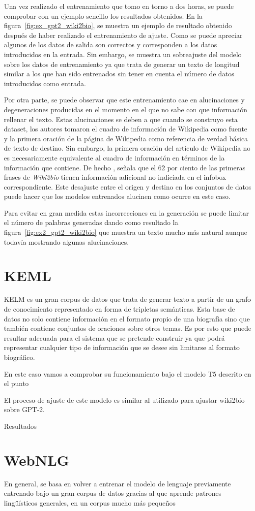 Una vez realizado el entrenamiento que tomo en torno a dos horas, se puede comprobar con un ejemplo sencillo los resultados obtenidos. En la figura~\ref{fig:ex_gpt2_wiki2bio}, se muestra un ejemplo de resultado obtenido después de haber realizado el entrenamiento de ajuste. Como se puede apreciar algunos de los datos de salida son correctos y corresponden a los datos introducidos en la entrada. Sin embargo, se muestra un sobreajuste del modelo sobre los datos de entrenamiento ya que trata de generar un texto de longitud similar a los que han sido entrenados sin tener en cuenta el número de datos introducidos como entrada. 


Por otra parte, se puede observar que este entrenamiento cae en alucinaciones y degeneraciones producidas en el momento en el que no sabe con que información rellenar el texto. Estas alucinaciones se deben a que cuando se construyo esta dataset, los autores tomaron el cuadro de información de Wikipedia como fuente y la primera oración de la página de Wikipedia como referencia de verdad básica de texto de destino. Sin embargo, la primera oración del artículo de Wikipedia no es necesariamente equivalente al cuadro de información en términos de la información que contiene. De hecho \cite{dhingra2019handling}, señala que el 62 por ciento de las primeras frases de \textit{Wiki2bio} tienen información adicional no indiciada en el infobox correspondiente. Este desajuste entre el origen y destino en los conjuntos de datos puede hacer que los modelos entrenados alucinen como ocurre en este caso.

Para evitar en gran medida estas incorrecciones en la generación se puede limitar el número de palabras generadas dando como resultado la figura~\ref{fig:ex2_gpt2_wiki2bio} que muestra un texto mucho más natural aunque todavía mostrando algunas alucinaciones.


\section{KEML}
KELM es un gran corpus de datos que trata de generar texto a partir de un grafo de conocimiento representado en forma de tripletas semánticas. Esta base de datos no solo contiene información en el formato propio de una biografía sino que también contiene conjuntos de oraciones sobre otros temas. Es por esto que puede resultar adecuada para el sistema que se pretende construir ya que podrá representar cualquier tipo de información que se desee sin limitarse al formato biográfico.

En este caso vamos a comprobar su funcionamiento bajo el modelo T5 descrito en el punto %

El proceso de ajuste de este modelo es similar al utilizado para ajustar wiki2bio sobre GPT-2.

Resultados

\section{WebNLG}



En general, se basa en volver a entrenar el modelo de lenguaje previamente entrenado bajo un gran corpus de datos gracias al que aprende patrones lingüísticos generales, en un corpus mucho más pequeños